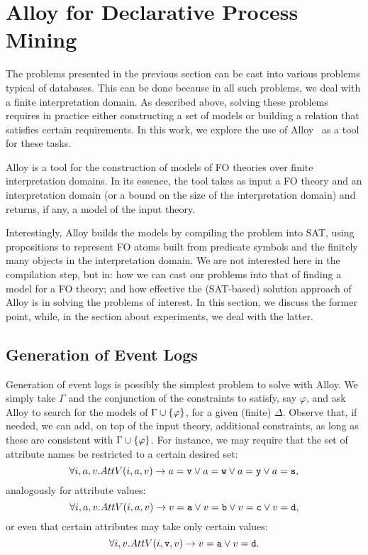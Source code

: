 \section{Alloy for Declarative Process Mining}

The problems presented in the previous section can be cast into
various problems
typical of databases. This can be done because in all such problems, we deal
with a finite interpretation domain.
As described above, solving these
problems requires in practice either constructing a set of models
or building
a relation that satisfies certain requirements.
In this work, we explore the use of Alloy~\cite{alloy} as a tool for
these tasks.

Alloy is a tool for the construction of models of FO theories over
finite interpretation domains. In its essence, the tool takes
as input a FO theory and an interpretation domain (or a bound
on the size of the interpretation domain) and returns,
if any, a model of the input theory.

Interestingly, Alloy builds the models by compiling the problem
into SAT, using propositions to represent FO atoms built from
predicate symbols and the finitely many objects in the interpretation
domain. We are not interested here in the compilation step,
but in: \myi how we can cast our problems
into that of finding a model for a FO theory; and \myii how effective
the (SAT-based) solution approach of Alloy is in solving the
problems of interest. In this section,
we discuss the former point, while, in the section
about experiments, we deal with the latter.

\subsection{Generation of Event Logs}
Generation of event logs is possibly the simplest
problem to solve with Alloy. We simply take $\Gamma$ and the
conjunction of the constraints to satisfy, say $\varphi$, and
ask Alloy to search for the models of $\Gamma\cup\{\varphi\}$,
for a given (finite) $\Delta$.
Observe that, if needed, we can add, on top of the input
theory, additional constraints, as long as these are
consistent with $\Gamma\cup\{\varphi\}$.
For instance, we may require that the set of
attribute names be restricted to a certain desired set:
$$\forall i,a,v.AttV(i,a,v)\rightarrow
	a=\mathtt{v}\lor
	a=\mathtt{w}\lor
	a=\mathtt{y}\lor
	a=\mathtt{s},$$
analogously for attribute values:
$$\forall i,a,v.AttV(i,a,v)\rightarrow
	v=\mathtt{a}\lor
	v=\mathtt{b}\lor
	v=\mathtt{c}\lor
	v=\mathtt{d},$$
or even that certain attributes may take only certain values:
$$\forall i,v.AttV(i,\mathtt{v},v)\rightarrow
	v=\mathtt{a}\lor
	v=\mathtt{d}.$$
	
